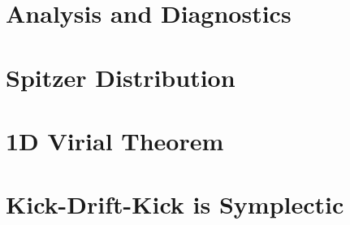 \documentclass{book}
\begin{document}
\chapter{Analysis and Diagnostics}


\appendix
\chapter{Spitzer Distribution}

\chapter{1D Virial Theorem}

\chapter{Kick-Drift-Kick is Symplectic}


\end{document}
